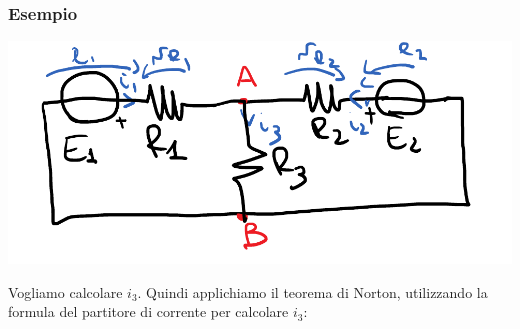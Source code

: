 \documentclass{article}
\begin{document}
\subsubsection{Esempio}
\begin{center}
    \includegraphics[scale=0.25]{Image/Esempio_Norton_0.png}
\end{center}
Vogliamo calcolare $i_3$. Quindi applichiamo il teorema di Norton, utilizzando la formula del partitore di corrente per calcolare $i_3$:
\end{document}
